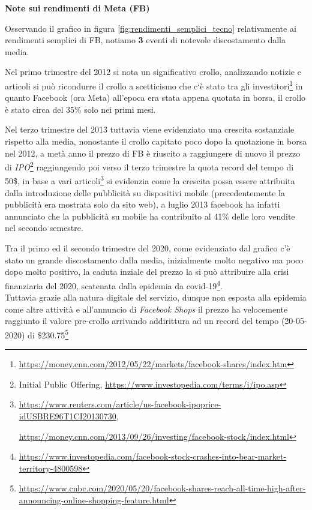 \pagebreak

\textbf{Note sui rendimenti di Meta (FB)}

Osservando il grafico in figura \ref{fig:rendimenti_semplici_tecno} relativamente ai rendimenti semplici di FB, notiamo \textbf{3} eventi di notevole discostamento dalla media.

Nel primo trimestre del 2012 si nota un significativo crollo, analizzando notizie e articoli si può ricondurre il crollo a scetticismo che c`è stato
tra gli investitori\footnote{\href{https://money.cnn.com/2012/05/22/markets/facebook-shares/index.htm}{https://money.cnn.com/2012/05/22/markets/facebook-shares/index.htm}} in quanto
Facebook (ora Meta) all'epoca era stata appena quotata in borsa, il crollo è stato circa del 35\% solo nei primi mesi.

Nel terzo trimestre del 2013 tuttavia viene evidenziato una crescita sostanziale rispetto alla media, nonostante il crollo capitato poco dopo la quotazione in borsa nel 2012,
a metà anno il prezzo di FB è riuscito a raggiungere di nuovo il prezzo di \emph{IPO}\footnote{Initial Public Offering, \href{https://www.investopedia.com/terms/i/ipo.asp}{https://www.investopedia.com/terms/i/ipo.asp}}
raggiungendo poi verso il terzo trimestre la quota record del tempo di 50\$, in base a vari 
articoli\footnote{
  \href{https://www.reuters.com/article/us-facebook-ipoprice-idUSBRE96T1CI20130730}{https://www.reuters.com/article/us-facebook-ipoprice-idUSBRE96T1CI20130730},
  
  \hspace{1.5mm} \href{https://money.cnn.com/2013/09/26/investing/facebook-stock/index.html}{https://money.cnn.com/2013/09/26/investing/facebook-stock/index.html}
  }
si evidenzia come la crescita possa essere attribuita dalla introduzione delle pubblicità su dispositivi mobile (precedentemente la pubblicità era mostrata solo da sito web),
a luglio 2013 facebook ha infatti annunciato che la pubblicità su mobile ha contribuito al 41\% delle loro vendite nel secondo semestre.

Tra il primo ed il secondo trimestre del 2020, come evidenziato dal grafico c'è stato un grande discostamento dalla media, inizialmente molto negativo ma poco dopo molto positivo,
la caduta inziale del prezzo la si può attribuire alla crisi finanziaria del 2020, scatenata dalla epidemia da 
covid-19\footnote{
  \href{https://www.investopedia.com/facebook-stock-crashes-into-bear-market-territory-4800598}{https://www.investopedia.com/facebook-stock-crashes-into-bear-market-territory-4800598}
}.\\
Tuttavia grazie alla natura digitale del servizio, dunque non esposta alla epidemia come altre attività e all'annuncio di \emph{Facebook Shops} il prezzo ha velocemente raggiunto il valore pre-crollo arrivando
addirittura ad un record del tempo (20-05-2020) di 
\$230.75\footnote{
  \href{https://www.cnbc.com/2020/05/20/facebook-shares-reach-all-time-high-after-announcing-online-shopping-feature.html}{https://www.cnbc.com/2020/05/20/facebook-shares-reach-all-time-high-after-announcing-online-shopping-feature.html}
}\\

